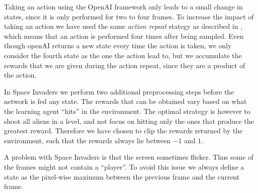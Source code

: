 \documentclass[11pt]{article}
\begin{document}
Taking an action using the OpenAI framework only leads to a small change in states,
since it is only performed for two to four frames.
To increase the impact of taking an action we have used the same \textit{action repeat}
stategy as described in \cite{a3c}, which means that an action is performed four times
after being sampled.
Even though openAI returns a new state every time the action is taken, we only consider
the fourth state as the one the action lead to, but we accumulate the rewards that
we are given during the action repeat, since they are a product of the action.

In Space Invaders we perform two additional preprocessing steps before
the network is fed any state.
The rewards that can be obtained vary based on what the learning agent “hits”
in the environment.
The optimal strategy is however to shoot all aliens in a level, and not focus on
hitting only the ones that produce the greatest reward.
Therefore we have chosen to clip the rewards returned by the environment, such that
the rewards always lie between $-1$ and $1$.

A problem with Space Invaders is that the screen sometimes flicker.
Thus some of the frames might not contain a “player”.
To avoid this issue we always define a state as the pixel-wise maximum
between the previous frame and the current frame.
\end{document}
